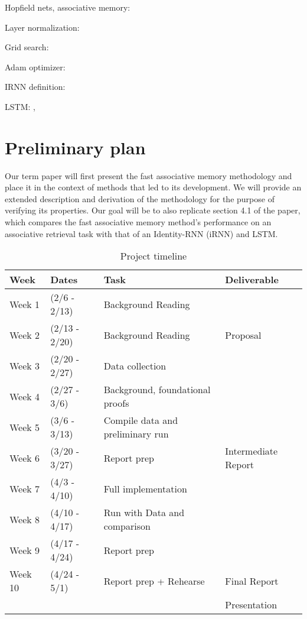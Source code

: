 Hopfield nets, associative memory: \cite{Mackay03informationtheory}

Layer normalization: \cite{1607.06450}

Grid search: \cite{Goodfellow-et-al-2016}

Adam optimizer: \cite{1412.6980}

IRNN definition: \cite{1511.03771}

LSTM: \cite{gers2000}, \cite{hochreiter1997}

\section{Preliminary plan}

Our term paper will first present the fast associative memory methodology and place it in the context of methods that led to its development. We will provide an extended description and derivation of the methodology for the purpose of verifying its properties. Our goal will be to also replicate section 4.1 of the paper, which compares the fast associative memory method's performance on an associative retrieval task with that of an Identity-RNN (iRNN) and LSTM.


\begin{table*}[t]
  \caption{Project timeline}
  \label{tab:freq}
  \begin{tabular}{llll}
    \toprule
    Week & Dates & Task & Deliverable\\
    \midrule
    Week 1 & (2/6   - 2/13) & Background Reading & \\
    Week 2 & (2/13  - 2/20) & Background Reading & Proposal\\
    Week 3 & (2/20  - 2/27) & Data collection & \\
    Week 4 & (2/27  - 3/6)  & Background, foundational proofs & \\
    Week 5 & (3/6   - 3/13) & Compile data and preliminary run & \\
    Week 6 & (3/20  - 3/27) & Report prep & Intermediate Report\\
    Week 7 & (4/3   - 4/10) & Full implementation & \\
    Week 8 & (4/10  - 4/17) & Run with Data and comparison & \\
    Week 9 & (4/17  - 4/24) & Report prep & \\
    Week 10 & (4/24 - 5/1) & Report prep + Rehearse & Final Report \\
    & & & Presentation\\
  \bottomrule
\end{tabular}
\end{table*}
